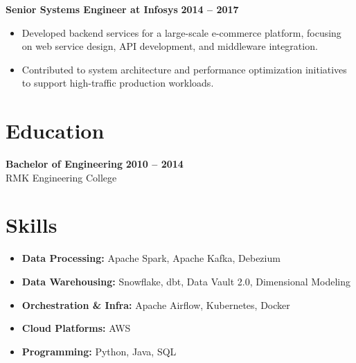 \documentclass[10pt,a4paper]{article}
\begin{document}
\vspace{0.5em}

\noindent
\textbf{Senior Systems Engineer at Infosys} \hfill \textbf{2014 -- 2017}
\begin{itemize}
    \item Developed backend services for a large-scale e-commerce platform, focusing on web service design, API development, and middleware integration.
    \item Contributed to system architecture and performance optimization initiatives to support high-traffic production workloads.
\end{itemize}

\section*{Education}
\noindent
\textbf{Bachelor of Engineering} \hfill \textbf{2010 -- 2014} \\
RMK Engineering College

\section*{Skills}
\begin{itemize}[label={}, leftmargin=0pt]
    \item \textbf{Data Processing:} Apache Spark, Apache Kafka, Debezium
    \item \textbf{Data Warehousing:} Snowflake, dbt, Data Vault 2.0, Dimensional Modeling
    \item \textbf{Orchestration \& Infra:} Apache Airflow, Kubernetes, Docker
    \item \textbf{Cloud Platforms:} AWS
    \item \textbf{Programming:} Python, Java, SQL
\end{itemize}
\end{document}

